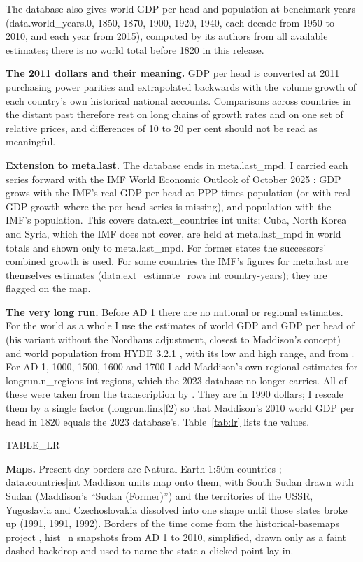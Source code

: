 \documentclass[11pt,a4paper]{article}
\begin{document}
The database also gives world GDP per head and population at benchmark years ({{data.world_years.0}}, 1850, 1870, 1900, 1920, 1940, each decade from 1950 to 2010, and each year from 2015), computed by its authors from all available estimates; there is no world total before 1820 in this release.

\textbf{The 2011 dollars and their meaning.} GDP per head is converted at 2011 purchasing power parities and extrapolated backwards with the volume growth of each country's own historical national accounts. Comparisons across countries in the distant past therefore rest on long chains of growth rates and on one set of relative prices, and differences of 10 to 20 per cent should not be read as meaningful.

\textbf{Extension to {{meta.last}}.} The database ends in {{meta.last_mpd}}. I carried each series forward with the IMF World Economic Outlook of October 2025 \citep{weo2025}: GDP grows with the IMF's real GDP per head at PPP times population (or with real GDP growth where the per head series is missing), and population with the IMF's population. This covers {{data.ext_countries|int}} units; Cuba, North Korea and Syria, which the IMF does not cover, are held at {{meta.last_mpd}} in world totals and shown only to {{meta.last_mpd}}. For former states the successors' combined growth is used. For some countries the IMF's figures for {{meta.last}} are themselves estimates ({{data.ext_estimate_rows|int}} country-years); they are flagged on the map.

\textbf{The very long run.} Before AD 1 there are no national or regional estimates. For the world as a whole I use the estimates of world GDP and GDP per head of \citet{delong1998} (his variant without the Nordhaus adjustment, closest to Maddison's concept) and world population from HYDE 3.2.1 \citep{hyde2017}, with its low and high range, and from \citet{mcevedy1978}. For AD 1, 1000, 1500, 1600 and 1700 I add Maddison's own regional estimates \citep{maddison2010} for {{longrun.n_regions|int}} regions, which the 2023 database no longer carries. All of these were taken from the transcription by \citet{roodman2020}. They are in 1990 dollars; I rescale them by a single factor ({{longrun.link|f2}}) so that Maddison's 2010 world GDP per head in 1820 equals the 2023 database's. Table~\ref{tab:lr} lists the values.

{{TABLE_LR}}

\textbf{Maps.} Present-day borders are Natural Earth 1:50m countries \citep{naturalearth}; {{data.countries|int}} Maddison units map onto them, with South Sudan drawn with Sudan (Maddison's ``Sudan (Former)'') and the territories of the USSR, Yugoslavia and Czechoslovakia dissolved into one shape until those states broke up (1991, 1991, 1992). Borders of the time come from the historical-basemaps project \citep{ourednik}, {{hist_n}} snapshots from AD 1 to 2010, simplified, drawn only as a faint dashed backdrop and used to name the state a clicked point lay in.
\end{document}
